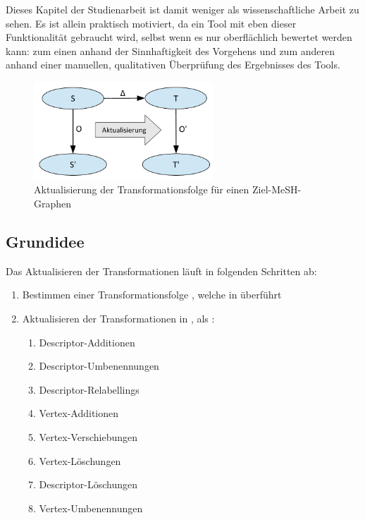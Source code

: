 Dieses Kapitel der Studienarbeit ist damit weniger als wissenschaftliche Arbeit zu sehen. Es ist allein praktisch motiviert, da ein Tool mit eben dieser Funktionalität gebraucht wird, selbst wenn es nur oberflächlich bewertet werden kann: zum einen anhand der Sinnhaftigkeit des Vorgehens und zum anderen anhand einer manuellen, qualitativen Überprüfung des Ergebnisses des Tools.



\begin{figure}[h]
\begin{center}
\includegraphics[width=0.6\textwidth]{figs/anualChangesStructure.pdf}
\end{center}
\caption{Aktualisierung der Transformationsfolge  für einen Ziel-MeSH-Graphen }
\label{fig:anualChangesStructure}
\end{figure}

\subsection{Grundidee}
Das Aktualisieren der Transformationen läuft in folgenden Schritten ab:\par

\begin{enumerate}
  \item Bestimmen einer Transformationsfolge \code{$\Delta$}, welche  in  überführt
  \item Aktualisieren der Transformationen in , als :
  \begin{enumerate}
    \item Descriptor-Additionen
    \item Descriptor-Umbenennungen
    \item Descriptor-Relabellings
    \item Vertex-Additionen
    \item Vertex-Verschiebungen
    \item Vertex-Löschungen
    \item Descriptor-Löschungen
    \item Vertex-Umbenennungen
  \end{enumerate}
\end{enumerate}

